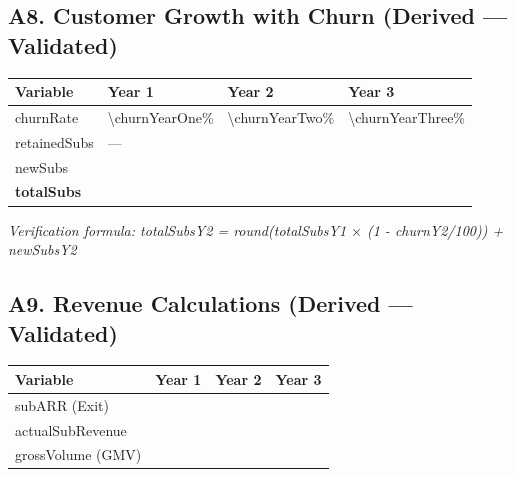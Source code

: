 \subsection*{A8. Customer Growth with Churn (Derived --- Validated)}
\begin{tabularx}{\linewidth}{l Y Y Y}
\toprule
\textbf{Variable} & \textbf{Year 1} & \textbf{Year 2} & \textbf{Year 3} \\\midrule
churnRate & \num{\churnYearOne}\% & \num{\churnYearTwo}\% & \num{\churnYearThree}\% \\
retainedSubs & --- & \validateint{\retainedSubsYearTwo}{\HCretainedSubsYearTwo} & \validateint{\retainedSubsYearThree}{\HCretainedSubsYearThree} \\
newSubs & \validateint{\newSubsYearOne}{\HCbaseNewSubsYearOne} & \validateint{\newSubsYearTwo}{\HCbaseNewSubsYearTwo} & \validateint{\newSubsYearThree}{\HCbaseNewSubsYearThree} \\
\textbf{totalSubs} & \validateint{\totalSubsYearOne}{\HCtotalSubsYearOne} & \validateint{\totalSubsYearTwo}{\HCtotalSubsYearTwo} & \validateint{\totalSubsYearThree}{\HCtotalSubsYearThree} \\
\bottomrule
\end{tabularx}

\medskip
\textit{Verification formula: totalSubsY2 = round(totalSubsY1 $\times$ (1 - churnY2/100)) + newSubsY2}

\subsection*{A9. Revenue Calculations (Derived --- Validated)}
\begin{tabularx}{\linewidth}{l Y Y Y}
\toprule
\textbf{Variable} & \textbf{Year 1} & \textbf{Year 2} & \textbf{Year 3} \\\midrule
subARR (Exit) & \validatemoney{\subARRYearOne}{\HCsubARRYearOne} & \validatemoney{\subARRYearTwo}{\HCsubARRYearTwo} & \validatemoney{\subARRYearThree}{\HCsubARRYearThree} \\
actualSubRevenue & \validatemoney{\actualSubRevenueYearOne}{\HCactualSubRevenueYearOne} & \validatemoney{\actualSubRevenueYearTwo}{\HCactualSubRevenueYearTwo} & \validatemoney{\actualSubRevenueYearThree}{\HCactualSubRevenueYearThree} \\
grossVolume (GMV) & \validatemoney{\grossVolumeYearOne}{\HCgrossVolumeYearOne} & \validatemoney{\grossVolumeYearTwo}{\HCgrossVolumeYearTwo} & \validatemoney{\grossVolumeYearThree}{\HCgrossVolumeYearThree} \\
\bottomrule
\end{tabularx}

